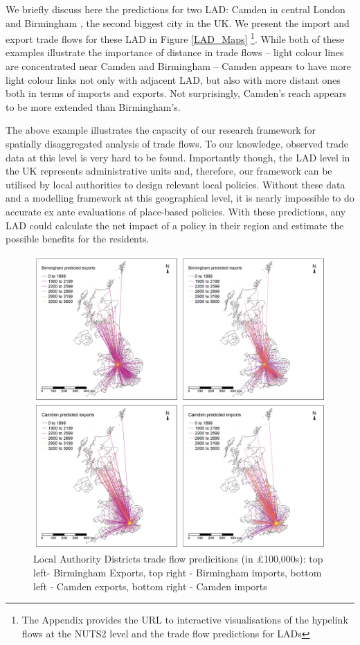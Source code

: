\documentclass[]{interact}
\theoremstyle{plain}%
\theoremstyle{definition}
\theoremstyle{remark}
\begin{document}
We briefly discuss here the predictions for two LAD: Camden in central
London and Birmingham , the second biggest city in the UK. We present
the import and export trade flows for these LAD in Figure \ref{LAD_Maps}
\footnote{The Appendix provides the URL to interactive visualisations of
  the hypelink flows at the NUTS2 level and the trade flow predictions
  for LADs}. While both of these examples illustrate the importance of
distance in trade flows -- light colour lines are concentrated near
Camden and Birmingham -- Camden appears to have more light colour links
not only with adjacent LAD, but also with more distant ones both in
terms of imports and exports. Not surprisingly, Camden's reach appears
to be more extended than Birmingham's.

The above example illustrates the capacity of our research framework for
spatially disaggregated analysis of trade flows. To our knowledge,
observed trade data at this level is very hard to be found. Importantly
though, the LAD level in the UK represents administrative units and,
therefore, our framework can be utilised by local authorities to design
relevant local policies. Without these data and a modelling framework at
this geographical level, it is nearly impossible to do accurate ex ante
evaluations of place-based policies. With these predictions, any LAD
could calculate the net impact of a policy in their region and estimate
the possible benefits for the residents.

\begin{figure}[p]
\includegraphics[width=1\linewidth]{figures/Predictions2_updated} \caption{\label{LAD_Maps}Local Authority Districts trade flow predicitions (in  £100,000s): top left- Birmingham Exports, top right - Birmingham imports, bottom left - Camden exports, bottom right - Camden imports}\label{fig:unnamed-chunk-14}
\end{figure}
\end{document}
